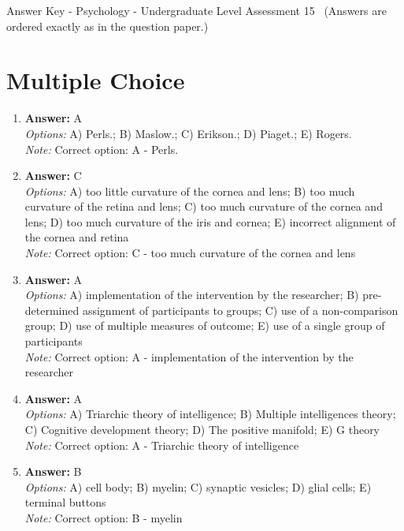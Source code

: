\documentclass[12pt]{article}
\begin{document}
\begin{center}
Answer Key - Psychology - Undergraduate Level Assessment 15 \
\small (Answers are ordered exactly as in the question paper.)
\end{center}

\section*{Multiple Choice}
\begin{enumerate}[label=\arabic*.]
\item \textbf{Answer:} A
\\ \textit{Options:} A) Perls.; B) Maslow.; C) Erikson.; D) Piaget.; E) Rogers.
\\ \textit{Note:} Correct option: A - Perls.
\item \textbf{Answer:} C
\\ \textit{Options:} A) too little curvature of the cornea and lens; B) too much curvature of the retina and lens; C) too much curvature of the cornea and lens; D) too much curvature of the iris and cornea; E) incorrect alignment of the cornea and retina
\\ \textit{Note:} Correct option: C - too much curvature of the cornea and lens
\item \textbf{Answer:} A
\\ \textit{Options:} A) implementation of the intervention by the researcher; B) pre-determined assignment of participants to groups; C) use of a non-comparison group; D) use of multiple measures of outcome; E) use of a single group of participants
\\ \textit{Note:} Correct option: A - implementation of the intervention by the researcher
\item \textbf{Answer:} A
\\ \textit{Options:} A) Triarchic theory of intelligence; B) Multiple intelligences theory; C) Cognitive development theory; D) The positive manifold; E) G theory
\\ \textit{Note:} Correct option: A - Triarchic theory of intelligence
\item \textbf{Answer:} B
\\ \textit{Options:} A) cell body; B) myelin; C) synaptic vesicles; D) glial cells; E) terminal buttons
\\ \textit{Note:} Correct option: B - myelin
\end{enumerate}
\end{document}

